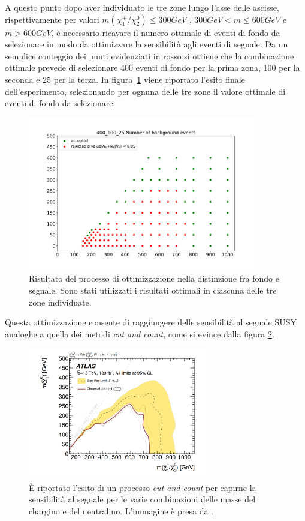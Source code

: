 A questo punto dopo aver individuato le tre zone lungo l'asse delle ascisse, rispettivamente per valori $ m(\chi^\pm_1/\chi^0_2) \le 300 GeV$ , $300 GeV < m \le 600 GeV$ e $m > 600 GeV$, è necessario ricavare il numero ottimale di eventi di fondo da selezionare in modo da ottimizzare la sensibilità agli eventi di segnale. Da un semplice conteggio dei punti evidenziati in rosso si ottiene che la combinazione ottimale prevede di selezionare 400 eventi di fondo per la prima zona, 100 per la seconda e 25 per la terza. In figura~\ref{mix} viene riportato l'esito finale dell'esperimento, selezionando per ognuna delle tre zone il valore ottimale di eventi di fondo da selezionare.

\begin{figure}[h!]
	\centering
	\includegraphics[width=0.90\textwidth]{figs/risultati_simulazione/mix.pdf}
	\caption{Risultato del processo di ottimizzazione nella distinzione fra fondo e segnale. Sono stati utilizzati i risultati ottimali in ciascuna delle tre zone individuate.}
	\label{mix}
\end{figure}

Questa ottimizzazione consente di raggiungere delle sensibilità al segnale SUSY analoghe a quella dei metodi \textit{cut and count}, come si evince dalla figura \ref{confronto}.

\newpage

\begin{figure}[h!]
	\centering
	\includegraphics[width=0.70\textwidth]{figs/risultati_simulazione/confronto.png}
	\caption{È riportato l'esito di un processo \textit{cut and count} per capirne la sensibilità al segnale per le varie combinazioni delle masse del chargino e del neutralino. L'immagine è presa da \cite{susy_alberto}.}
	\label{confronto}
\end{figure}

